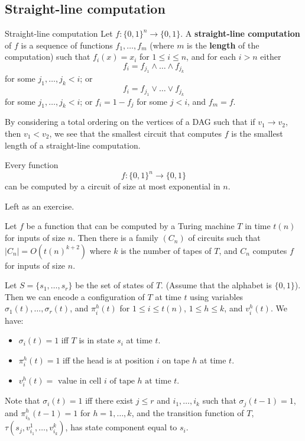 \documentclass{article}
\begin{document}
\subsection{Straight-line computation}
\begin{fancydefine}{Straight-line computation}
    Let $f : \{0,1\}^{n} \to \{0,1\}$. A \textbf{straight-line computation} of $f$ is a sequence of functions $f_{1}, \dots, f_{m}$ (where $m$ is the \textbf{length} of the computation) such that $f_{i}(x)=x_{i}$ for $1 \leq i \leq n$, and for each $i>n$ either \[ f_{i} = f_{j_{1}} \wedge \dots \wedge f_{j_{k}}\] for some $j_{1},\dots, j_{k} < i$; or \[ f_{i} = f_{j_{1}} \vee \dots \vee f_{j_{k}}\] for some $j_{1},\dots, j_{k} < i$; or $f_{i}=1-f_{j}$ for some $j<i$, and $f_{m}=f$.
\end{fancydefine}
By considering a total ordering on the vertices of a DAG such that if $v_{1} \to v_{2}$, then $v_{1} < v_{2}$, we see that the smallest circuit that computes $f$ is the smallest length of a straight-line computation.
\begin{fancylem}{}
    Every function \[ f : \{0,1\}^{n} \to \{0,1\}\] can be computed by a circuit of size at most exponential in $n$.
\end{fancylem}
\proof Left as an exercise.
\begin{fancyprop}{}
    Let $f$ be a function that can be computed by a Turing machine $T$ in time $t(n)$ for inputs of size $n$. Then there is a family $(C_{n})$ of circuits such that $|C_{n}| = O(t(n)^{k+2})$ where $k$ is the number of tapes of $T$, and $C_{n}$ computes $f$ for inputs of size $n$.
\end{fancyprop}
\proof Let $S = \{s_{1}, \dots, s_{r}\}$ be the set of states of $T$. (Assume that the alphabet is $\{0,1\}$). Then we can encode a configuration of $T$ at time $t$ using variables $\sigma_{1}(t), \dots, \sigma_{r}(t)$, and $\pi_{i}^{h}(t)$ for $1 \leq i \leq t(n)$, $1 \leq h \leq k$, and $v_{i}^{h}(t)$. \gap We have: 
\begin{itemize} 
    \item $\sigma_{i}(t) = 1$ iff $T$ is in state $s_{i}$ at time $t$.
    \item $\pi_{i}^{h}(t) = 1$ iff the head is at position $i$ on tape $h$ at time $t$. 
    \item $v_{i}^{h}(t) = \text{ value in cell $i$ of tape $h$ at time $t$.}$
\end{itemize}
Note that $\sigma_{i}(t)=1$ iff there exist $j \leq r$ and $i_{1}, \dots, i_{k}$ such that $\sigma_{j}(t-1)=1$, and $\pi_{i_{h}}^{h}(t-1)=1$ for $h=1, \dots, k$, and the transition function of $T$, $\tau(s_{j},v_{i_{1}}^{1}, \dots, v_{i_{k}}^{k})$, has state component equal to $s_{i}$.\gap 
\end{document}
